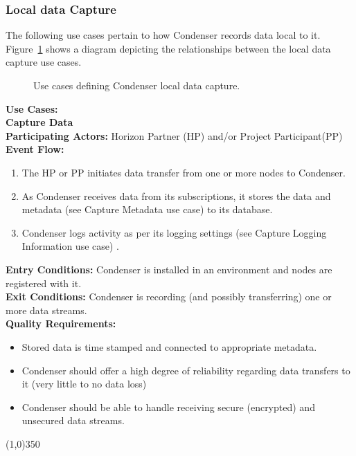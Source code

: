 \subsubsection{Local data Capture}		 
The following use cases pertain to how Condenser records data local to it. Figure~\ref{LocalDataCaptureUse} shows a diagram depicting the relationships between the local data capture use cases.
\begin{center}
	\begin{figure}[htbp]
		\caption{Use cases defining Condenser local data capture. \label{LocalDataCaptureUse}}
	\end{figure}
\end{center}	
\textbf{Use Cases:}\\

		\textbf{Capture Data}\\	 
		\textbf{Participating Actors:} Horizon Partner (HP) and/or Project Participant(PP) \\
		\textbf{Event Flow:}
		\begin{enumerate}
\item The HP or PP initiates data transfer from one or more nodes to Condenser.
\item As Condenser receives data from its subscriptions, it stores the data and metadata (see Capture Metadata use case) to its database.
\item Condenser logs activity as per its logging settings  (see Capture  Logging Information use case) .
	    \end{enumerate}
		\textbf{Entry Conditions:} Condenser is installed in an environment and nodes are registered with it.\\
		\textbf{Exit Conditions:} Condenser is recording (and possibly transferring) one or more data streams.\\
		\textbf{Quality Requirements:} 
		\begin{itemize}
\item Stored data is time stamped and connected to appropriate metadata.
\item Condenser should offer a high degree of reliability regarding data transfers to it (very little to no data loss)
\item Condenser should be able to handle receiving secure (encrypted) and unsecured data streams.
		\end{itemize}
		\line(1,0){350}	
		
